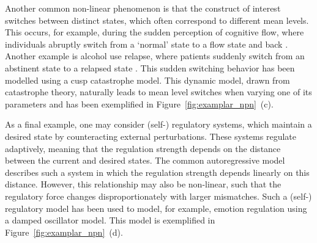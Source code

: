 \documentclass[man, floatsintext]{apa7}
\begin{document}
Another common non-linear phenomenon is that the construct of interest
switches between distinct states, which often correspond to different mean
levels. This occurs, for example, during the sudden perception of cognitive
flow, where individuals abruptly switch from a `normal' state to a flow state
and back \parencite{ceja_suddenly_2012}. Another example is alcohol use
relapse, where patients suddenly switch from an abstinent state to a relapsed
state \parencite{witkiewitz_modeling_2007}. This sudden switching behavior has
been modelled using a cusp catastrophe model. This dynamic model, drawn from
catastrophe theory, naturally leads to mean level switches when varying one
of its parameters \parencite{van_der_maas_sudden_2003,chow_cusp_2015}
and has been exemplified in Figure~\ref{fig:examplar_npn}~(c).

As a final example, one may consider (self-) regulatory systems, which maintain
a desired state by counteracting external perturbations. These systems regulate
adaptively, meaning that the regulation strength depends on the distance
between the
current and desired states. The common autoregressive model describes such a
system in which the regulation strength depends linearly on this distance.
However, this relationship may also be non-linear, such that the
regulatory force changes disproportionately with larger mismatches. Such
a (self-) regulatory model has been used to model, for example, emotion
regulation \parencite{chow_emotion_2005} using a damped oscillator model.
This model is exemplified in Figure~\ref{fig:examplar_npn}~(d).
\end{document}
